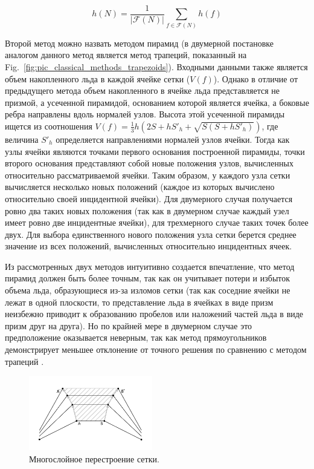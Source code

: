 \documentclass[
11pt,%
tightenlines,%
twoside,%
onecolumn,%
nofloats,%
nobibnotes,%
nofootinbib,%
superscriptaddress,%
noshowpacs,%
centertags]%
{revtex4}
\begin{document}
\begin{equation}
h(N) = \frac{1}{|\mathscr{F}(N)|} \sum_{f \in \mathscr{F}(N)}{h(f)}
\end{equation}

Второй метод можно назвать методом пирамид (в двумерной постановке аналогом данного метод является метод трапеций, показанный на Fig.~\ref{fig:pic_classical_methods_trapezoids}).
Входными данными также является объем накопленного льда в каждой ячейке сетки ($V(f)$).
Однако в отличие от предыдущего метода объем накопленного в ячейке льда представляется не призмой, а усеченной пирамидой, основанием которой является ячейка, а боковые ребра направлены вдоль нормалей узлов.
Высота этой усеченной пирамиды ищется из соотношения $V(f) = \frac{1}{3} h (2S + hS'_h + \sqrt{S(S + hS'_h)})$, где величина $S'_h$ определяется направлениями нормалей узлов ячейки.
Тогда как узлы ячейки являются точками первого основания построенной пирамиды, точки второго основания представляют собой новые положения узлов, вычисленных относительно рассматриваемой ячейки.
Таким образом, у каждого узла сетки вычисляется несколько новых положений (каждое из которых вычислено относительно своей инцидентной ячейки).
Для двумерного случая получается ровно два таких новых положения (так как в двумерном случае каждый узел имеет ровно две инцидентные ячейки), для трехмерного случае таких точек более двух.
Для выбора единственного нового положения узла сетки берется среднее значение из всех положений, вычисленных относительно инцидентных ячеек.

Из рассмотренных двух методов интуитивно создается впечатление, что метод пирамид должен быть более точным, так как он учитывает потери и избыток объема льда, образующиеся из-за изломов сетки (так как соседние ячейки не лежат в одной плоскости, то представление льда в ячейках в виде призм неизбежно приводит к образованию пробелов или наложений частей льда в виде призм друг на друга).
Но по крайней мере в двумерном случае это предположение оказывается неверным, так как метод прямоугольников демонстрирует меньшее отклонение от точного решения по сравнению с методом трапеций \cite{Rybakov_2D}.

\begin{figure}[h]
\includegraphics[width=0.48\textwidth]{pics/pic_classical_methods_multilayer_size.pdf}
\caption{Многослойное перестроение сетки.}\label{fig:pic_classical_methods_multilayer}
\end{figure}
\end{document}

